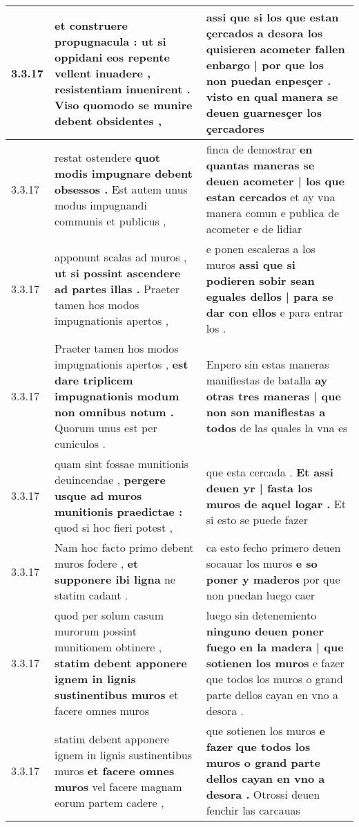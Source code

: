\begin{tabular}{|p{1cm}|p{6.5cm}|p{6.5cm}|}
3.3.17 & et construere propugnacula : \textbf{ ut si oppidani eos repente vellent inuadere , resistentiam inuenirent . } Viso quomodo se munire debent obsidentes , & assi que si los que estan çercados \textbf{ a desora los quisieren acometer fallen enbargo | por que los non puedan enpesçer . } visto en qual manera se deuen guarnesçer los çercadores \\\hline
3.3.17 & restat ostendere \textbf{ quot modis impugnare debent obsessos . } Est autem unus modus impugnandi communis et publicus , & finca de demostrar \textbf{ en quantas maneras se deuen acometer | los que estan cercados } et ay vna manera comun e publica de acometer e de lidiar \\\hline
3.3.17 & apponunt scalas ad muros , \textbf{ ut si possint ascendere ad partes illas . } Praeter tamen hos modos impugnationis apertos , & e ponen escaleras a los muros \textbf{ assi que si podieren sobir sean eguales dellos | para se dar con ellos } e para entrar los . \\\hline
3.3.17 & Praeter tamen hos modos impugnationis apertos , \textbf{ est dare triplicem impugnationis modum non omnibus notum . } Quorum unus est per cuniculos . & Enpero sin estas maneras manifiestas de batalla \textbf{ ay otras tres maneras | que non son manifiestas a todos } de las quales la vna es \\\hline
3.3.17 & quam sint fossae munitionis deuincendae , \textbf{ pergere usque ad muros munitionis praedictae : } quod si hoc fieri potest , & que esta cercada . \textbf{ Et assi deuen yr | fasta los muros de aquel logar . } Et si esto se puede fazer \\\hline
3.3.17 & Nam hoc facto primo debent muros fodere , \textbf{ et supponere ibi ligna } ne statim cadant . & ca esto fecho primero deuen socauar los muros \textbf{ e so poner y maderos } por que non puedan luego caer \\\hline
3.3.17 & quod per solum casum murorum possint munitionem obtinere , \textbf{ statim debent apponere ignem in lignis sustinentibus muros } et facere omnes muros & luego sin detenemiento \textbf{ ninguno deuen poner fuego en la madera | que sotienen los muros } e fazer que todos los muros o grand parte dellos cayan en vno a desora . \\\hline
3.3.17 & statim debent apponere ignem in lignis sustinentibus muros \textbf{ et facere omnes muros } vel facere magnam eorum partem cadere , & que sotienen los muros \textbf{ e fazer que todos los muros o grand parte dellos cayan en vno a desora . } Otrossi deuen fenchir las carcauas \\\hline

\end{tabular}
